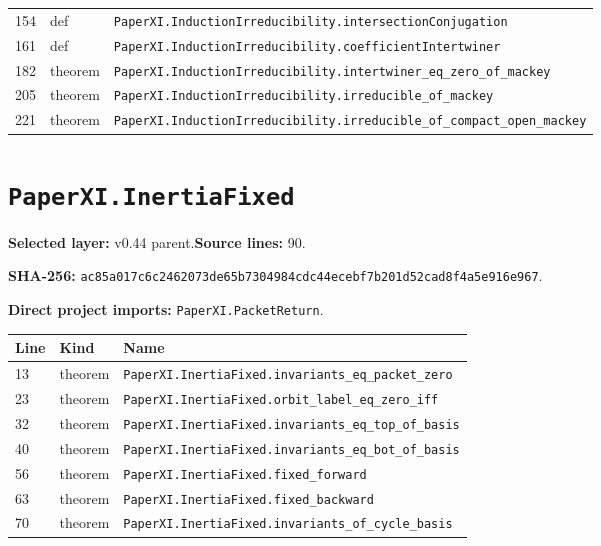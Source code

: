 \documentclass[10pt,oneside]{book}
\begin{document}
\begin{longtable}{@{}p{}p{}p{}@{}}
154&def&\nolinkurl{PaperXI.InductionIrreducibility.intersectionConjugation}\\

161&def&\nolinkurl{PaperXI.InductionIrreducibility.coefficientIntertwiner}\\

182&theorem&\nolinkurl{PaperXI.InductionIrreducibility.intertwiner_eq_zero_of_mackey}\\

205&theorem&\nolinkurl{PaperXI.InductionIrreducibility.irreducible_of_mackey}\\

221&theorem&\nolinkurl{PaperXI.InductionIrreducibility.irreducible_of_compact_open_mackey}\\

\bottomrule\end{longtable}

\section{\texorpdfstring{\nolinkurl{PaperXI.InertiaFixed}}{PaperXI.InertiaFixed}}\label{module:PaperXI.InertiaFixed}

\textbf{Selected layer:} v0.44 parent.\quad\textbf{Source lines:} 90.\par\textbf{SHA-256:} {\scriptsize\nolinkurl{ac85a017c6c2462073de65b7304984cdc44ecebf7b201d52cad8f4a5e916e967}}.


\textbf{Direct project imports:} \nolinkurl{PaperXI.PacketReturn}.

\begin{longtable}{@{}p{}p{}p{}@{}}\toprule Line&Kind&Name\\\midrule\endhead

13&theorem&\nolinkurl{PaperXI.InertiaFixed.invariants_eq_packet_zero}\\

23&theorem&\nolinkurl{PaperXI.InertiaFixed.orbit_label_eq_zero_iff}\\

32&theorem&\nolinkurl{PaperXI.InertiaFixed.invariants_eq_top_of_basis}\\

40&theorem&\nolinkurl{PaperXI.InertiaFixed.invariants_eq_bot_of_basis}\\

56&theorem&\nolinkurl{PaperXI.InertiaFixed.fixed_forward}\\

63&theorem&\nolinkurl{PaperXI.InertiaFixed.fixed_backward}\\

70&theorem&\nolinkurl{PaperXI.InertiaFixed.invariants_of_cycle_basis}\\

\bottomrule\end{longtable}
\end{document}
